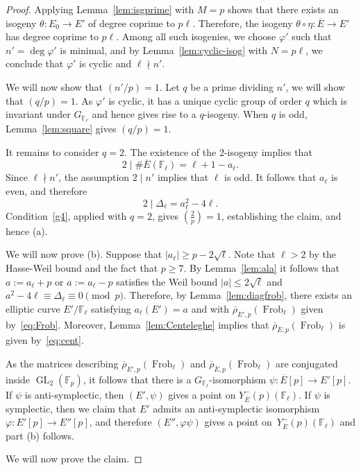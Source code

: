 \documentclass[12pt]{amsart}
\numberwithin{equation}{section}
\theoremstyle{definition}
\newcommand{\F}{\mathbb{F}}
\newcommand{\rhobar}{{\overline{\rho}}}
\DeclareMathOperator{\GL}{GL}
\DeclareMathOperator{\Frob}{Frob}
\newcommand{\oE}{\overline{E}}
\begin{document}
\begin{proof}
Applying Lemma~\ref{lem:isgprime} with $M=p$ shows that there exists an isogeny $\theta: E_0 \to E'$ of degree coprime to $p \ell$. Therefore, the isogeny $\theta\circ\eta: \oE\to E'$ has degree coprime to $p\ell$. Among all such isogenies, we choose $\varphi'$ such that $n'=\deg \varphi'$ is minimal, and by Lemma~\ref{lem:cyclic-isog} with $N=p\ell$, we conclude that $\varphi'$ is cyclic and $\ell \nmid n'$.

We will now show that $(n'/p)=1$.
Let $q$ be a prime dividing $n'$, we will show that $(q/p)=1$. As $\varphi'$ is cyclic, it has a unique cyclic group of order $q$ which is invariant under $G_{\F_\ell}$ and hence gives rise to a $q$-isogeny. When $q$ is odd, Lemma~\ref{lem:square} gives $(q/p)=1$.

It remains to consider $q=2$. The existence of the $2$-isogeny implies that  
\[
    2\mid\#\overline E(\F_\ell)=\ell+1-a_\ell.
\]
Since $\ell\nmid n'$, the assumption $2\mid n'$ implies that $\ell$ is odd.
It follows that $a_\ell$ is even, and therefore
\[
    2\mid\Delta_\ell=a_\ell^2-4\ell.
\]
Condition~\eqref{g4}, applied with $q=2$, gives $\left(\frac{2}{p}\right)=1$, establishing the claim, and hence (a). 

We will now prove (b). 
Suppose that $|a_\ell| \geq p-2\sqrt{\ell}$. Note that $\ell>2$ by the Hasse-Weil bound and the fact that $p\geq 7$.
By Lemma~\ref{lem:ala} it follows that $a := a_\ell + p$ or $a:=a_\ell-p$ satisfies the Weil bound $|a|\leq 2\sqrt{\ell}$ and $a^2-4\ell \equiv \Delta_\ell \equiv 0 \pmod p$. 
Therefore, by Lemma~\ref{lem:diagfrob}, there exists an elliptic curve $E'/\F_\ell$ satisfying $a_\ell(E')=a$ and with $\rhobar_{E',p}(\Frob_\ell)$ given by~\eqref{eq:Frob}. Moreover, Lemma~\ref{lem:Centeleghe} implies that $\rhobar_{\oE,p}(\Frob_\ell)$ is given by~\eqref{eq:cent}.

As the matrices describing $\rhobar_{E',p}(\Frob_\ell)$ and $\rhobar_{\oE,p}(\Frob_\ell)$ are conjugated inside $\GL_2(\F_p)$, it follows
that there is a $G_{\F_\ell}$-isomorphism $\psi: \oE[p] \to E'[p]$. If $\psi$ is anti-symplectic, then $(E',\psi)$ gives a point on $Y_{\oE}^-(p)(\F_\ell)$. If $\psi$ is symplectic, then we claim that $E'$ admits an anti-symplectic isomorphism $\varphi :E'[p] \to E''[p]$, and therefore $(E'', \varphi \psi)$ gives a point on~$Y_{\oE }^-(p)(\F_\ell)$
and part (b) follows.

We will now prove the claim.


\end{proof}
\end{document}
